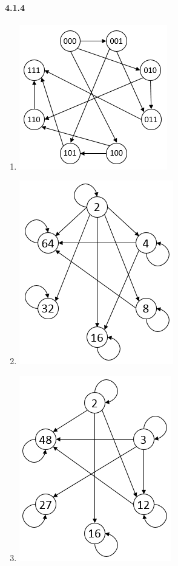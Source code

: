 \documentclass[11pt, letterpaper, twocolumn, fleqn]{article}
\begin{document}
    \paragraph{4.1.4}
        \begin{enumerate}
            \item \includegraphics[scale=.7]{414a}
            \item \includegraphics[scale=.7]{414b}
            \item \includegraphics[scale=.7]{414c}

\end{enumerate}
\end{document}
